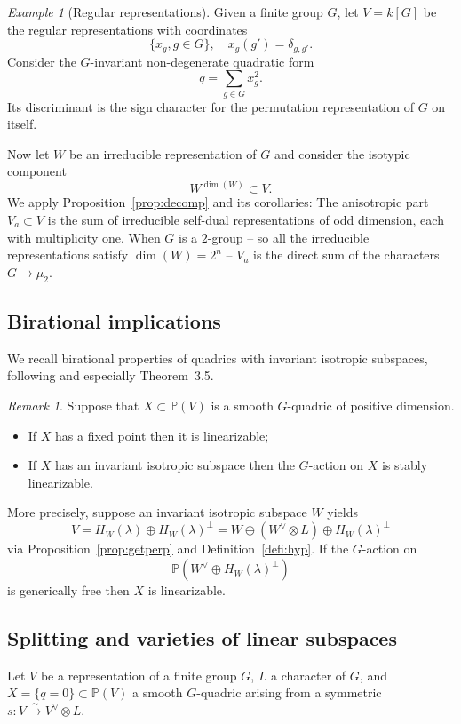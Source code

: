 \documentclass[12pt]{amsart}
\numberwithin{equation}{section}
\newcommand{\ra}{\rightarrow}
\newcommand{\bP}{\mathbb{P}}
\theoremstyle{plain}
\theoremstyle{definition}
\theoremstyle{remark}
\newtheorem{rema}[prop]{Remark}
\newtheorem{exam}[prop]{Example}
\begin{document}
\begin{exam}[Regular representations]
Given a finite group $G$, let $V=k[G]$ be the regular
representations with coordinates 
$$\{x_g, g\in G\}, \quad x_g(g')=\delta_{g,g'}.$$
Consider the $G$-invariant non-degenerate quadratic form
$$q=\sum_{g\in G} x_g^2.$$
Its discriminant is the sign character for the permutation
representation of $G$ on itself.  

Now let $W$ be an irreducible representation of $G$ 
and consider the isotypic component
$$W^{\dim(W)} \subset V.$$
We apply Proposition~\ref{prop:decomp} and its corollaries:
The anisotropic part $V_a \subset V$ is the 
sum of irreducible self-dual representations of odd dimension,
each with multiplicity one. When $G$ is a $2$-group --
so all the irreducible representations satisfy
$\dim(W )=2^n$ -- 
$V_a$ is the direct sum of the characters $G \ra \mu_2$.
\end{exam}




\subsection*{Birational implications}

We recall birational properties 
of quadrics with invariant isotropic subspaces, following \cite[\S 3]{HTEGLDQ} and especially Theorem~3.5.
\begin{rema} \label{rema:isostab}
Suppose that $X\subset \bP(V)$ is a smooth $G$-quadric
of positive dimension.
\begin{itemize}
\item{If $X$ has a fixed point then it is linearizable;}
\item{If $X$ has an invariant isotropic subspace then the $G$-action on $X$
is stably linearizable.}
\end{itemize}
More precisely, suppose an invariant isotropic subspace $W$
yields
$$V = H_W(\lambda) \oplus H_W(\lambda)^{\perp}  = W \oplus (W^{\vee} \otimes L) \oplus H_W(\lambda)^{\perp}$$ 
via Proposition~\ref{prop:getperp} and Definition~\ref{defi:hyp}. If the $G$-action on
$$
\bP(W^{\vee} \oplus H_W(\lambda)^{\perp})
$$ 
is 
generically free then $X$ is linearizable.  
\end{rema}




\subsection*{Splitting and varieties 
of linear subspaces}
Let $V$ be a representation of a finite 
group $G$, $L$ a character of $G$, and
$X = \{q=0 \} \subset \bP(V)$
a smooth $G$-quadric arising from a 
symmetric $s:V \stackrel{\sim}{\ra} V^{\vee} \otimes L$. 
\end{document}
